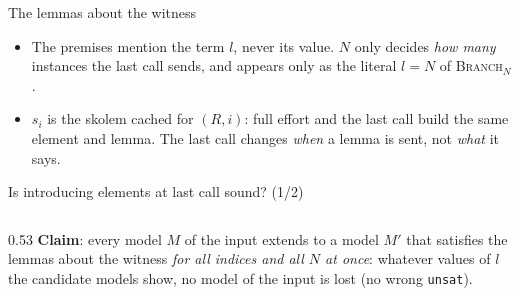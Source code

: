 \documentclass[aspectratio=169]{beamer}
\newcommand{\sm}[1]{\texttt{#1}}
\newcommand{\rn}[1]{\textsc{#1}}
\begin{document}
\begin{frame}{The lemmas about the witness}
\begin{center}
  \end{center}
  \begin{itemize}
    \item The premises mention the term $l$, never its value. $N$ only decides \emph{how many}
      instances the last call sends, and appears only as the literal $l = N$ of \rn{Branch}$_N$.
    \item $s_i$ is the skolem cached for $(R, i)$: full effort and the last call build the same
      element and lemma. The last call changes \emph{when} a lemma is sent, not \emph{what} it
      says.
  \end{itemize}
\end{frame}

\begin{frame}{Is introducing elements at last call sound? (1/2)}
  \begin{columns}[T]
  \begin{column}{0.53\textwidth}
    \small
    \textbf{Claim}: every model $M$ of the input extends to a model $M'$ that satisfies the
    lemmas about the witness \emph{for all indices and all $N$ at once}: whatever values of
    $l$ the candidate models show, no model of the input is lost (no wrong \sm{unsat}).
    \medskip


\end{column}
\end{columns}
\end{frame}
\end{document}
